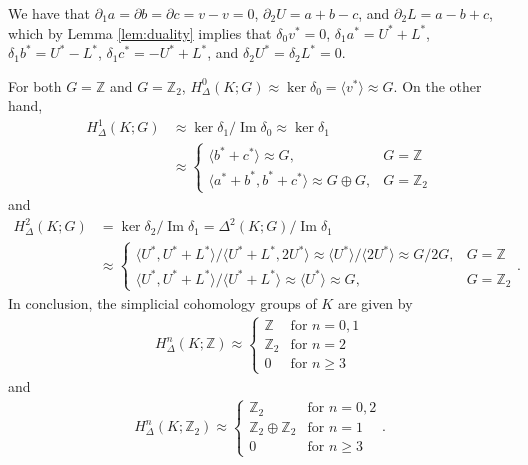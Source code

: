 \documentclass[12pt]{article}
\DeclareMathOperator{\im}{Im}
\newcommand{\iso}{\approx}
\begin{document}
\begin{enumerate}
\begin{enumerate}
                We have that $\partial_1 a = \partial b = \partial c = v - v = 0$, $\partial_2 U = a + b - c$, and $\partial_2 L = a - b + c$, which by Lemma \ref{lem:duality} implies that $\delta_0 v^* = 0$, $\delta_1 a^* = U^* + L^*$, $\delta_1 b^* = U^* - L^*$, $\delta_1 c^* = -U^* + L^*$, and $\delta_2 U^* = \delta_2 L^* = 0$. \par
                For both $G = \mathbb{Z}$ and $G = \mathbb{Z}_2$, $H_\Delta^0(K; G) \iso \ker\delta_0 = \langle v^* \rangle \iso G$. On the other hand,
                \begin{align*}
                    H_\Delta^1(K; G) &\iso \ker\delta_1 / \im\delta_0 \iso \ker\delta_1 \\
                    &\iso \begin{cases}
                        \langle b^* + c^* \rangle \iso G, &G = \mathbb{Z} \\
                        \langle a^* + b^*, b^* + c^* \rangle \iso G \oplus G, &G = \mathbb{Z}_2
                    \end{cases}
                \end{align*}
                and
                \begin{align*}
                    H_\Delta^2(K; G) &= \ker\delta_2 / \im\delta_1 = \Delta^2(K; G) / \im\delta_1 \\
                    &\iso \begin{cases}
                        \langle U^*, U^* + L^* \rangle / \langle U^* + L^*, 2U^* \rangle \iso \langle U^* \rangle / \langle 2U^* \rangle \iso G/2G, &G = \mathbb{Z} \\
                        \langle U^*, U^* + L^* \rangle / \langle U^* + L^* \rangle \iso \langle U^* \rangle \iso G, &G = \mathbb{Z}_2
                    \end{cases}.
                \end{align*}
                In conclusion, the simplicial cohomology groups of $K$ are given by
                \begin{align*}
                    H_\Delta^n(K; \mathbb{Z}) \iso \begin{cases}
                        \mathbb{Z} &\text{for } n = 0, 1 \\
                        \mathbb{Z}_2 &\text{for } n = 2 \\
                        0 &\text{for } n \geq 3
                    \end{cases}
                \end{align*}
                and
                \begin{align*}
                    H_\Delta^n(K; \mathbb{Z}_2) \iso \begin{cases}
                        \mathbb{Z}_2 &\text{for } n = 0, 2 \\
                        \mathbb{Z}_2 \oplus \mathbb{Z}_2 &\text{for } n = 1 \\
                        0 &\text{for } n \geq 3
                    \end{cases}.
                \end{align*}
        \end{enumerate}


\end{enumerate}
\end{document}
